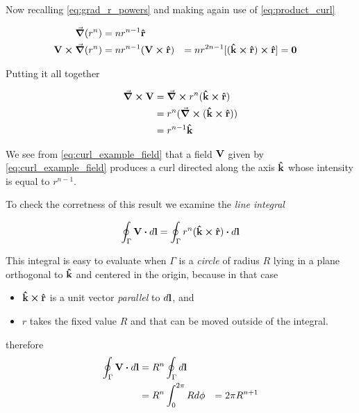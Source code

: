 Now recalling \ref{eq:grad_r_powers} and making again use of \ref{eq:product_curl}  

\begin{equation*}
\begin{aligned}
\grad (r^n) &= n r^{n-1} \vu{r} \\
\vb{V} \cross \grad (r^n) &= n r^{n-1} (\vb{V} \cross \vu{r})
                          &= n r^{2n-1} [(\vu{k} \cross \vu{r})  \cross \vu{r}] 
                          &= \vb{0}
\end{aligned} 
\end{equation*}

Putting it all together 

\begin{equation}
\begin{aligned}
\curl{\vb{V}} &= \curl{r^n (\vu{k} \cross \vu{r})} \\
              &= r^n (\curl{(\vu{k} \cross \vu{r})}) \\
              &= r^{n-1} \vu{k}
\end{aligned}
\label{eq:curl_example_value}
\end{equation}

We see from \ref{eq:curl_example_field} that a field $\vb{V}$ given by \ref{eq:curl_example_field} produces a curl directed along the axis $\vu{k}$ whose intensity is equal to $r^{n-1}$. 

To check the corretness of this result we examine the \textit{line integral}

\begin{equation*}
\oint_{\Gamma} \vb{V} \vdot d\vb{l} = \oint_{\Gamma} r^n (\vu{k} \cross \vu{r}) \vdot d\vb{l}  
\end{equation*}
  
This integral is easy to evaluate when $\Gamma$ is a \textit{circle} of radius $R$ lying in a plane orthogonal to $\vu{k}$ and centered in the origin, because in that case 
\begin{itemize}
\item $\vu{k} \cross \vu{r}$ is a unit vector \textit{parallel} to $d\vb{l}$, and
\item $r$ takes the fixed value $R$ and that can be moved outside of the integral.
\end{itemize}

therefore 
\begin{equation}
\begin{aligned}
\oint_{\Gamma} \vb{V} \vdot d\vb{l} &= R^n \oint_{\Gamma} d\vb{l} \\
                                    &= R^n \int_0^{2\pi} R d\phi 
                                    &= 2\pi R^{n+1} 
\end{aligned}
\label{eq:field_circolation}
\end{equation}

